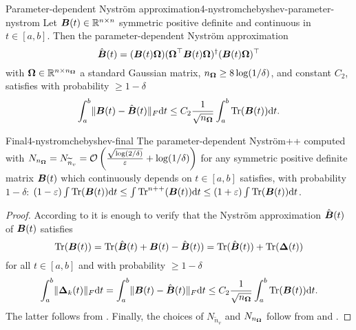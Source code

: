 \begin{lemma}{Parameter-dependent Nystr\"om approximation}{4-nystromchebyshev-parameter-nystrom}
    Let $\boldsymbol{B}(t) \in \mathbb{R}^{n \times n}$ symmetric positive definite and continuous in $t \in [a, b]$. Then the parameter-dependent Nystr\"om approximation
    \begin{equation}
        \hat{\boldsymbol{B}}(t) = (\boldsymbol{B}(t) \boldsymbol{\Omega}) (\boldsymbol{\Omega}^{\top} \boldsymbol{B}(t) \boldsymbol{\Omega})^{\dagger} (\boldsymbol{B}(t) \boldsymbol{\Omega})^{\top}
    \end{equation}
    with $\boldsymbol{\Omega} \in \mathbb{R}^{n \times n_{\boldsymbol{\Omega}}}$ a standard Gaussian matrix, $n_{\boldsymbol{\Omega}} \geq 8 \log(1/\delta)$, and constant $C_2$, satisfies with probability $\geq 1 - \delta$
    \begin{equation}
        \int_{a}^{b} \lVert \boldsymbol{B}(t) - \hat{\boldsymbol{B}}(t) \rVert _F \mathrm{d}t \leq C_2 \frac{1}{\sqrt{n_{\boldsymbol{\Omega}}}} \int_{a}^{b} \operatorname{Tr}(\boldsymbol{B}(t)) \mathrm{d}t.
    \end{equation}
\end{lemma}

\begin{theorem}{Final}{4-nystromchebyshev-final}
    The parameter-dependent Nystr\"om++ computed with $N_{n_{\boldsymbol{\Omega}}} = N_{\widetilde{n}_v} = \mathcal{O}\left( \frac{\sqrt{\log(2/\delta)}}{\varepsilon} + \log(1/\delta) \right)$ for any symmetric positive definite matrix $\boldsymbol{B}(t)$ which continuously depends on $t \in [a, b]$ satisfies, with probability $1 - \delta$: $(1 - \varepsilon) \int \operatorname{Tr}(\boldsymbol{B}(t)) \mathrm{d}t \leq \int \operatorname{Tr}^{n++}(\boldsymbol{B}(t)) \mathrm{d}t \leq  (1 + \varepsilon) \int \operatorname{Tr}(\boldsymbol{B}(t)) \mathrm{d}t$.
\end{theorem}

\begin{proof}
    According to  it is enough to verify that the Nystr\"om approximation $\hat{\boldsymbol{B}}(t)$ of $\boldsymbol{B}(t)$ satisfies
    \begin{equation}
        \operatorname{Tr}(\boldsymbol{B}(t)) = \operatorname{Tr}(\hat{\boldsymbol{B}}(t) + \boldsymbol{B}(t) - \hat{\boldsymbol{B}}(t)) = \operatorname{Tr}(\hat{\boldsymbol{B}}(t)) + \operatorname{Tr}(\boldsymbol{\Delta}(t))
    \end{equation}
    for all $t \in [a, b]$ and with probability $\geq 1 - \delta$
    \begin{equation}
        \int_{a}^{b} \lVert \boldsymbol{\Delta}_k(t) \rVert _F \mathrm{d}t = \int_{a}^{b} \lVert \boldsymbol{B}(t) - \hat{\boldsymbol{B}}(t) \rVert _F \mathrm{d}t \leq C_2 \frac{1}{\sqrt{n_{\boldsymbol{\Omega}}}} \int_{a}^{b} \operatorname{Tr}(\boldsymbol{B}(t)) \mathrm{d}t.
    \end{equation}
    The latter follows from . Finally, the choices of $N_{\widetilde{n}_v}$ and $N_{n_{\boldsymbol{\Omega}}}$ follow from  and .
\end{proof}

